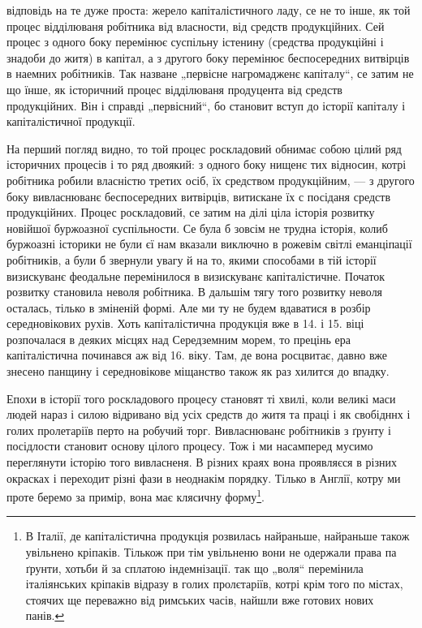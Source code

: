 \parcont{}
відповідь на те дуже проста: жерело капіталістичного ладу,
се не то інше, як той процес відділюваня робітника
від власности, від средств продукційних.
Сей процес з одного боку перемінює суспільну істенину
(средства продукційні і знадоби до житя) в капітал, а з другого
боку перемінює беспосередних витвірців в наемних
робітників. Так назване „первісне нагромадженє капіталу“,
се затим не що їнше, як історичний процес відділюваня
продуцента від средств продукційних. Він і справді „первісний“,
бо становит вступ до історії капіталу і капіталістичної
продукції.

На перший погляд видно, то той процес роскладовий
обнимає собою цілий ряд історичних процесів і то ряд двоякий:
з одного боку нищенє тих відносин, котрі робітника
робили власністю третих осіб, їх средством продукційним,
— з другого боку вивласнюванє беспосередних витвірців,
витискане їх с посіданя средств продукційних. Процес роскладовий,
се затим на ділі ціла історія розвитку новійшої
буржоазної суспільности. Се була б зовсім не трудна історія,
колиб буржоазні історики не були єї нам вказали виключно
в рожевім світлі еманціпації робітників, а були б звернули
увагу й на то, якими способами в тій історії визискуванє
феодальне перемінилося в визискуванє капіталістичне. Початок
розвитку становила неволя робітника. В дальшім тягу
того розвитку неволя осталась, тілько в зміненій формі.
Але ми ту не будем вдаватися в розбір середновікових рухів.
Хоть капіталістична продукція вже в 14. і 15. віці розпочалася
в деяких місцях над Середземним морем, то прецінь
ера капіталістична починався аж від 16. віку. Там,
де вона росцвитає, давно вже знесено панщину і середновікове
міщанство також як раз хилится до впадку.

Епохи в історії того роскладового процесу становят ті
хвилі, коли великі маси людей нараз і силою відривано від
усіх средств до житя та праці і як свобідннх і голих пролетаріїв
перто на робучий торг. Вивласнюванє робітників
з ґрунту і посідлости становит основу цілого процесу. Тож
і ми насамперед мусимо переглянути історію того вивласненя.
В різних краях вона проявляєся в різних окрасках
і переходит різні фази в неоднакім порядку. Тілько в Англії,
котру ми проте беремо за примір, вона має клясичну форму\footnote{
В Італії, де капіталістична продукція розвилась найраньше, найраньше
також увільнено кріпаків. Тількож при тім увільненю вони не
одержали права па ґрунти, хотьби й за сплатою індемнізації. так що
„воля“ перемінила італіянських кріпаків відразу в голих пролєтаріїв, котрі
крім того по містах, стоячих ще переважно від римських часів, найшли
вже готових нових панів.
}.
